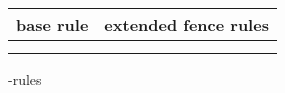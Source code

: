 \begin{figure}[t]
	\begin{tabular}{|c||c|c|c|}
		\multicolumn{1}{c}{base rule} & 
		\multicolumn{3}{c}{extended fence rules} \\\hline
		
		\resizebox{0.24\textwidth}{!}{} &
		\resizebox{0.24\textwidth}{!}{} &
		\resizebox{0.24\textwidth}{!}{} &
		\resizebox{0.24\textwidth}{!}{} \\
		
		\resizebox{0.24\textwidth}{!}{} &
		\resizebox{0.24\textwidth}{!}{} &&\\
		\hline
		
	\end{tabular}
	\caption{\lsw-rules}
	\label{fig:sw rules}
\end{figure}

